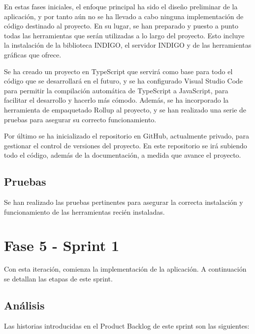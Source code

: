 En estas fases iniciales, el enfoque principal ha sido el diseño preliminar de la aplicación, y por tanto aún no se ha llevado a cabo ninguna implementación de código destinado al proyecto. En su lugar, se han preparado y puesto a punto todas las herramientas que serán utilizadas a lo largo del proyecto. Esto incluye la instalación de la biblioteca INDIGO, el servidor INDIGO y de las herramientas gráficas que ofrece.

Se ha creado un proyecto en TypeScript que servirá como base para todo el código que se desarrollará en el futuro, y se ha configurado Visual Studio Code para permitir la compilación automática de TypeScript a JavaScript, para facilitar el desarrollo y hacerlo más cómodo. Además, se ha incorporado la herramienta de empaquetado Rollup al proyecto, y se han realizado una serie de pruebas para asegurar su correcto funcionamiento.

Por último se ha inicializado el repositorio en GitHub, actualmente privado, para gestionar el control de versiones del proyecto. En este repositorio se irá subiendo todo el código, además de la documentación, a medida que avance el proyecto.

\subsection{Pruebas}

Se han realizado las pruebas pertinentes para asegurar la correcta instalación y funcionamiento de las herramientas recién instaladas. 

\newpage

\section{Fase 5 - Sprint 1}

Con esta iteración, comienza la implementación de la aplicación. A continuación se detallan las etapas de este sprint.

\subsection{Análisis}

Las historias introducidas en el Product Backlog de este sprint son las siguientes:

